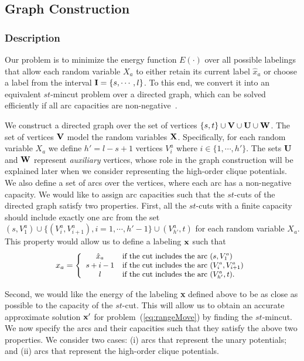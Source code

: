 \documentclass[10pt,letterpaper]{article}
\begin{document}
\subsection{Graph Construction}
\label{subsec:graph}

\subsubsection{Description}

Our problem is to minimize the energy function $E(\cdot)$ over all possible labelings that allow each random variable $X_a$ to either
retain its current label $\hat{x}_a$ or choose a label from the interval ${\bf I} = \{s,\cdots,l\}$.
To this end, we convert it into an equivalent $st$-{\sc mincut} problem over a directed graph, which can be solved efficiently if all arc capacities are non-negative~\cite{boykovpami04}.

We construct a directed graph over the set of vertices $\{s,t\} \cup {\bf V} \cup {\bf U} \cup {\bf W}$. The set of vertices ${\bf V}$ model the random variables
${\bf X}$. Specifically,
for each random variable $X_a$ we define $h'=l-s+1$ vertices $V^a_i$ where $i \in \{1,\cdots,h'\}$.
The sets ${\bf U}$ and ${\bf W}$ represent {\em auxiliary}
vertices, whose role in the graph construction will be explained later when we consider representing the high-order clique potentials. We also define a set of
arcs over the vertices, where each arc has a non-negative capacity.
We would like to assign arc capacities such that the $st$-cuts of the directed graph satisfy two properties. First, all the $st$-cuts with a finite capacity
should include exactly one arc from the set $(s,V^a_1) \cup \{(V^a_i,V^a_{i+1}), i=1,\cdots,h'-1\} \cup (V^a_{h'},t)$
for each random variable $X_a$. This property would allow us to define a labeling ${\bf x}$ such that
\begin{equation}
\small x_a = \left\{
\begin{array}{cl}
\hat{x}_a & \mbox{if the cut includes the arc } (s,V^a_1) \\
s+i-1 & \mbox{if the cut includes the arc } (V^a_i,V^a_{i+1}) \\
l & \mbox{if the cut includes the arc } (V^a_{h'},t). \\
\end{array}
\right.
\label{eq:labeling}
\end{equation}

Second, we would like the energy of the labeling {\bf x} defined above to be as close as possible to the capacity of the $st$-cut. This will allow
us to obtain an accurate approximate solution ${\bf x}'$ for problem~(\ref{eq:rangeMove}) by finding the $st$-{\sc mincut}.
We now specify the arcs and their capacities such that they
satisfy the above two properties. We consider two cases: (i) arcs that represent the unary potentials; and (ii) arcs that represent the high-order clique potentials.
\end{document}
